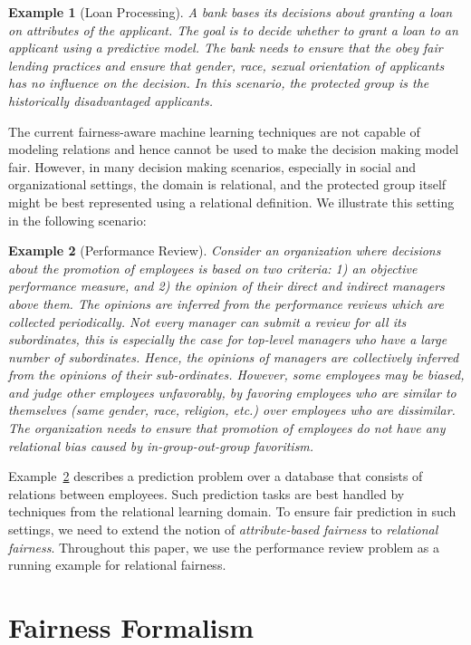 \documentclass[11pt]{article}
\newtheorem{myex}{\textbf{Example}}
\begin{document}
\begin{myex}[Loan Processing]
\label{ex:loan}
A bank bases its decisions about granting a loan on attributes of the applicant. The goal is to decide whether to grant a loan to an applicant using a predictive model. The bank needs to ensure that the obey fair lending practices and ensure that gender, race, sexual orientation of applicants has no influence on the decision. In this scenario, the protected group is the historically disadvantaged applicants.  
\end{myex}
The current fairness-aware machine learning techniques are not capable of modeling relations and hence cannot be used to make the decision making model fair. However, in many decision making scenarios, especially in social and organizational settings, the domain is relational, and the protected group itself might be best represented using a relational definition. We illustrate this setting in the following scenario:
\begin{myex}[Performance Review]
\label{ex:review}
Consider an organization where decisions about the promotion of employees is based on two criteria: 1) an objective performance measure, and 2) the opinion of their direct and indirect managers above them. The opinions are inferred from the performance reviews which are collected periodically. Not every manager can submit a review for all its subordinates, this is especially the case for top-level managers who have a large number of subordinates. Hence, the opinions of managers are collectively inferred from the opinions of their sub-ordinates. However, some employees may be biased, and judge other employees unfavorably, by favoring employees who are similar to themselves (same gender, race, religion, etc.) over employees who are dissimilar. The organization needs to ensure that promotion of employees do not have any relational bias caused by in-group-out-group favoritism.

\end{myex}
Example~\ref{ex:review} describes a prediction problem over a database that consists of relations between employees. Such prediction tasks are best handled by techniques from the relational learning domain. To ensure fair prediction in such settings, we need to extend the notion of \emph{attribute-based fairness} to \emph{relational fairness}. Throughout this paper, we use the performance review problem as a running example for relational fairness.

\section{Fairness Formalism}
\label{sec:formulation}
\end{document}
